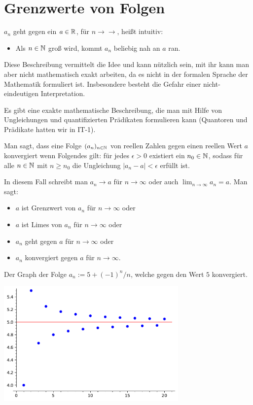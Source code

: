 \section{Grenzwerte von Folgen} 

\begin{bem} 
	$a_n$ geht gegen ein $a \in \mathbb{R}$, für $n \to \rightarrow$, heißt intuitiv: 
	
	\begin{itemize}
			\item[] Als $n \in \mathbb{N}$ groß wird, kommt $a_n$ beliebig nah an $a$ ran. 
	\end{itemize} 

	Diese Beschreibung vermittelt die Idee und kann nützlich sein, mit ihr kann man aber nicht mathematisch exakt arbeiten, da es nicht in der formalen Sprache der Mathematik formuliert ist. Insbesondere besteht die Gefahr einer nicht-eindeutigen Interpretation. 
	
	Es gibt eine exakte mathematische Beschreibung, die man mit Hilfe von Ungleichungen und quantifizierten Prädikaten formulieren kann (Quantoren und Prädikate hatten wir in IT-1). 
\end{bem} 

\begin{defn} 
	Man sagt, dass eine Folge $(a_n)_{n \in \mathbb{N}}$ von reellen Zahlen gegen einen reellen Wert $a$ konvergiert wenn Folgendes gilt: für jedes $\epsilon>0$ existiert ein $n_0 \in \mathbb{N}$, sodass für alle $n \in \mathbb{N}$ mit $n \ge n_0$ die Ungleichung $|a_n - a| < \epsilon$ erfüllt ist. 
	
	In diesem Fall schreibt man $a_n \to a$ für $n \to \infty$ oder auch $\lim_{n \to \infty} a_n = a$. Man sagt: 
	\begin{itemize}
		\item $a$ ist Grenzwert von $a_n$ für $n  \to \infty$ oder 
		\item $a$ ist Limes von $a_n$ für $n \to \infty$ oder 
		\item $a_n$ geht gegen $a$ für $n \to \infty$ oder 
		\item $a_n$ konvergiert gegen $a$ für $n \to \infty$. 
	\end{itemize} 
\end{defn} 

\begin{bem}
	Der Graph der Folge $a_n := 5 + (-1)^n / n$, welche gegen den Wert $5$ konvergiert. 
\begin{center}
	\includegraphics[width=0.7\textwidth]{code/grenzwert.pdf}
\end{center} 
\end{bem} 

